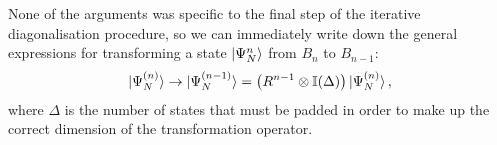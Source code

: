 \documentclass[reprint]{revtex4-2}
\begin{document}
None of the arguments was specific to the final step of the iterative diagonalisation procedure, so we can immediately write down the general expressions for transforming a state \(\ket{\Psi_N^n}\) from \(B_n\) to \(B_{n-1}\):
\begin{equation}\begin{aligned}
\ket{\Psi_N^{(n)}} \to \ket{\Psi_N^{(n - 1)}} = \left( R^{n-1} \otimes \mathbb{I}(\Delta) \right) \ket{\Psi_N^{(n)}},
\end{aligned}\end{equation}
where \(\Delta\) is the number of states that must be padded in order to make up the correct dimension of the transformation operator.
\end{document}
